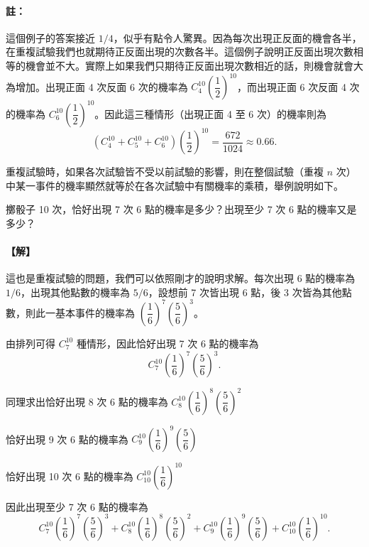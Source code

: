 \vspace{0.8em}
\paragraph{註：}
這個例子的答案接近 $1/4$，似乎有點令人驚異。因為每次出現正反面的機會各半，在重複試驗我們也就期待正反面出現的次數各半。這個例子說明正反面出現次數相等的機會並不大。實際上如果我們只期待正反面出現次數相近的話，則機會就會大為增加。出現正面 4 次反面 6 次的機率為 $C_4^{10}\left(\dfrac{1}{2}\right)^{10}$，而出現正面 6 次反面 4 次的機率為 $C_6^{10}\left(\dfrac{1}{2}\right)^{10}$。因此這三種情形（出現正面 4 至 6 次）的機率則為
\[
(C_4^{10} + C_5^{10} + C_6^{10})\left(\frac{1}{2}\right)^{10} = \frac{672}{1024} \approx 0.66.
\]

重複試驗時，如果各次試驗皆不受以前試驗的影響，則在整個試驗（重複 $n$ 次）中某一事件的機率顯然就等於在各次試驗中有關機率的乘積，舉例說明如下。

\vspace{1em}
\begin{discussion}\label{disc:b5-3-6}
擲骰子 10 次，恰好出現 7 次 6 點的機率是多少？出現至少 7 次 6 點的機率又是多少？
\end{discussion}
\paragraph{【解】}
這也是重複試驗的問題，我們可以依照剛才的說明求解。每次出現 6 點的機率為 $1/6$，出現其他點數的機率為 $5/6$，設想前 7 次皆出現 6 點，後 3 次皆為其他點數，則此一基本事件的機率為 $\left(\dfrac{1}{6}\right)^7 \left(\dfrac{5}{6}\right)^3$。

由排列可得 $C_7^{10}$ 種情形，因此恰好出現 7 次 6 點的機率為
\[
C_7^{10} \left(\frac{1}{6}\right)^7 \left(\frac{5}{6}\right)^3.
\]

\indent 同理求出恰好出現 8 次 6 點的機率為 $C_8^{10} \left(\dfrac{1}{6}\right)^8 \left(\dfrac{5}{6}\right)^2$

\indent 恰好出現 9 次 6 點的機率為 $C_9^{10} \left(\dfrac{1}{6}\right)^9 \left(\dfrac{5}{6}\right)$

\indent 恰好出現 10 次 6 點的機率為 $C_{10}^{10} \left(\dfrac{1}{6}\right)^{10}$

因此出現至少 7 次 6 點的機率為
\[
C_7^{10} \left(\frac{1}{6}\right)^7 \left(\frac{5}{6}\right)^3 + C_8^{10} \left(\frac{1}{6}\right)^8 \left(\frac{5}{6}\right)^2 + C_9^{10} \left(\frac{1}{6}\right)^9 \left(\frac{5}{6}\right) + C_{10}^{10} \left(\frac{1}{6}\right)^{10}.
\]


